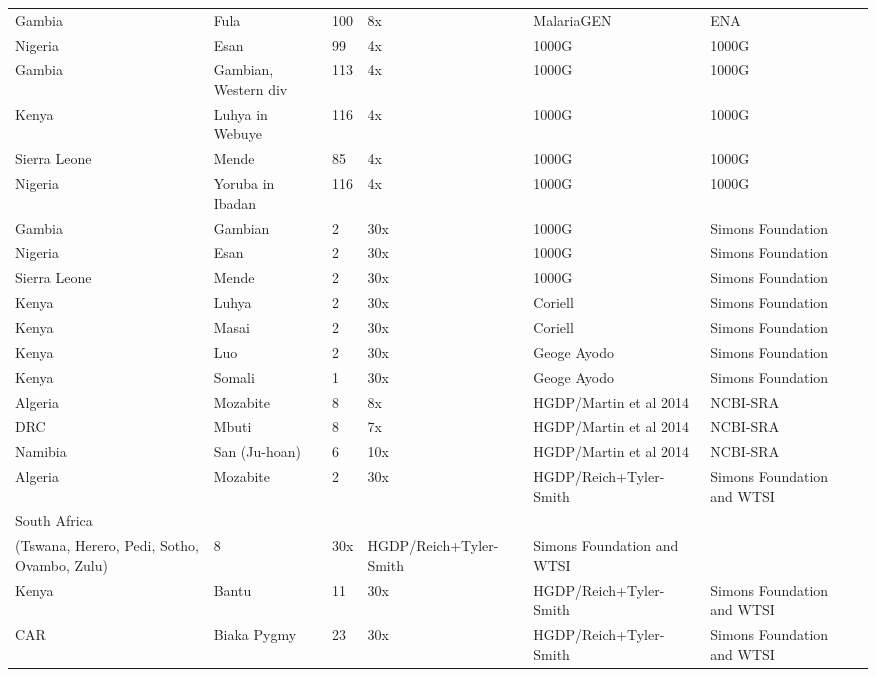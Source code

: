 \begin{landscape}
\begin{longtable}{lllllll}
Gambia & Fula & 100 & 8x & MalariaGEN & ENA \\
Nigeria & Esan & 99 & 4x & 1000G & 1000G \\
Gambia & Gambian, Western div & 113 & 4x & 1000G & 1000G \\
Kenya & Luhya in Webuye & 116 & 4x & 1000G & 1000G \\
Sierra Leone & Mende & 85 & 4x & 1000G & 1000G \\
Nigeria & Yoruba in Ibadan & 116 & 4x & 1000G & 1000G \\
Gambia & Gambian & 2 & 30x & 1000G & Simons Foundation \\
Nigeria & Esan & 2 & 30x & 1000G & Simons Foundation \\
Sierra Leone & Mende & 2 & 30x & 1000G & Simons Foundation \\
Kenya & Luhya & 2 & 30x & Coriell & Simons Foundation \\
Kenya & Masai & 2 & 30x & Coriell & Simons Foundation \\
Kenya & Luo & 2 & 30x & Geoge Ayodo & Simons Foundation \\
Kenya & Somali & 1 & 30x & Geoge Ayodo & Simons Foundation \\
Algeria & Mozabite & 8 & 8x & HGDP/Martin et al 2014 & NCBI-SRA \\
DRC & Mbuti & 8 & 7x & HGDP/Martin et al 2014 & NCBI-SRA \\
Namibia & San (Ju-hoan) & 6 & 10x & HGDP/Martin et al 2014 & NCBI-SRA \\
Algeria & Mozabite & 2 & 30x & HGDP/Reich+Tyler-Smith & Simons Foundation and WTSI \\
South Africa & \begin{tabular}[b]{@{}l@{}}Bantu\\(Tswana, Herero, Pedi, Sotho, Ovambo, Zulu)\end{tabular} & 8 & 30x & HGDP/Reich+Tyler-Smith & Simons Foundation and WTSI \\
Kenya & Bantu & 11 & 30x & HGDP/Reich+Tyler-Smith & Simons Foundation and WTSI \\
CAR & Biaka Pygmy & 23 & 30x & HGDP/Reich+Tyler-Smith & Simons Foundation and WTSI \\

\end{longtable}
\end{landscape}
